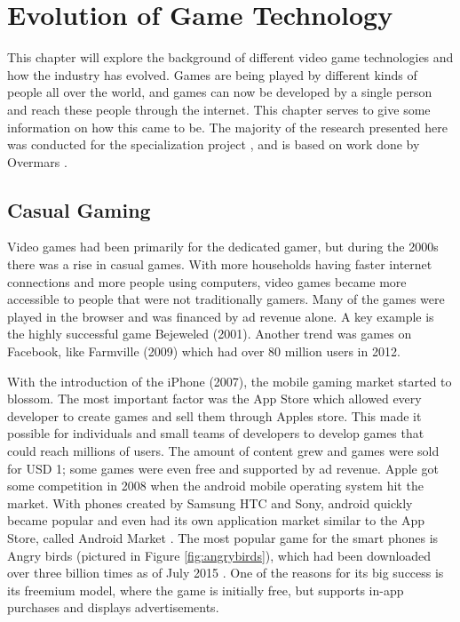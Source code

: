 \chapter{Evolution of Game Technology}
\label{ch:gameshistory}
This chapter will explore the background of different video game technologies and how the industry has evolved. Games are being played by different kinds of people all over the world, and games can now be developed by a single person and reach these people through the internet. This chapter serves to give some information on how this came to be. The majority of the research presented here was conducted for the specialization project \cite{hovind2015alternative}, and is based on work done by Overmars \cite{overmars2012}.

\section{Casual Gaming}
\label{sec:casualgaming}
Video games had been primarily for the dedicated gamer, but during the 2000s there was a rise in casual games. With more households having faster internet connections and more people using computers, video games became more accessible to people that were not traditionally gamers. Many of the games were played in the browser and was financed by ad revenue alone. A key example is the highly successful game Bejeweled (2001). Another trend was games on Facebook, like Farmville (2009) which had over 80 million users in 2012.

With the introduction of the iPhone (2007), the mobile gaming market started to blossom. The most important factor was the App Store which allowed every developer to create games and sell them through Apples store. This made it possible for individuals and small teams of developers to develop games that could reach millions of users. The amount of content grew and games were sold for USD 1; some games were even free and supported by ad revenue. Apple got some competition in 2008 when the android mobile operating system hit the market. With phones created by Samsung HTC and Sony, android quickly became popular and even had its own application market similar to the App Store, called Android Market \cite{2015android}. The most popular game for the smart phones is Angry birds (pictured in Figure \ref{fig:angrybirds}), which had been downloaded over three billion times as of July 2015 \cite{2015forbes}. One of the reasons for its big success is its freemium model, where the game is initially free, but supports in-app purchases and displays advertisements.

